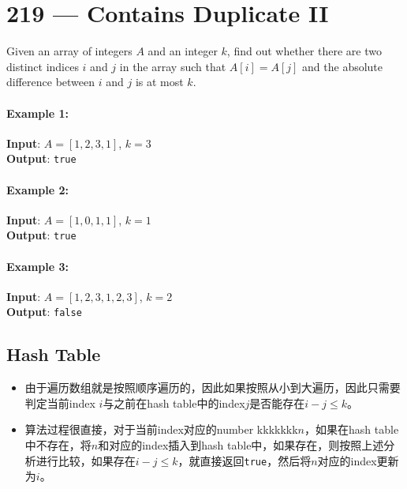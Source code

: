 \section{219 --- Contains Duplicate II}
Given an array of integers $A$ and an integer $k$, find out whether there are two distinct indices $i$ and $j$ in the array such that $A[i] = A[j]$ and the absolute difference between $i$ and $j$ is at most $k$.
\paragraph{Example 1:}
\begin{flushleft}
\textbf{Input}: $A = [1,2,3,1]$, $k = 3$
\\
\textbf{Output}: \texttt{true}
\end{flushleft}

\paragraph{Example 2:}
\begin{flushleft}
\textbf{Input}: $A = [1,0,1,1]$, $k = 1$
\\
\textbf{Output}: \texttt{true}
\end{flushleft}
\paragraph{Example 3:}
\begin{flushleft}
\textbf{Input}: $A = [1,2,3,1,2,3]$, $k = 2$
\\
\textbf{Output}: \texttt{false}
\end{flushleft}
\subsection{Hash Table}
\begin{itemize}
    \item 由于遍历数组就是按照顺序遍历的，因此如果按照从小到大遍历，因此只需要判定当前index $i$与之前在hash table中的index$j$是否能存在$i-j\leq k$。
    \item 算法过程很直接，对于当前index对应的number kkkkkkk$n$，如果在hash table中不存在，将$n$和对应的index插入到hash table中，如果存在，则按照上述分析进行比较，如果存在$i-j\leq k$，就直接返回\texttt{true}，然后将$n$对应的index更新为$i$。
\end{itemize}



\setcounter{lstlisting}{0}

